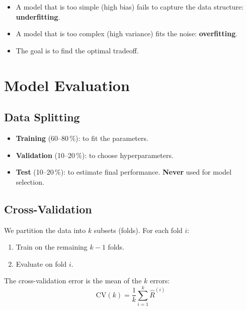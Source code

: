 \begin{intuition}[title=\textbf{Interpretation}]
\begin{itemize}
  \item A model that is too simple (high bias) fails to capture the data
    structure: \textbf{underfitting}.
  \item A model that is too complex (high variance) fits the noise:
    \textbf{overfitting}.
  \item The goal is to find the optimal tradeoff.
\end{itemize}
\end{intuition}

\section{Model Evaluation}
\label{sec:evaluation}

\subsection{Data Splitting}

\begin{bestpractice}[title=\textbf{Train / Validation / Test}]
\begin{itemize}
  \item \textbf{Training} (60--80\,\%): to fit the parameters.
  \item \textbf{Validation} (10--20\,\%): to choose hyperparameters.
  \item \textbf{Test} (10--20\,\%): to estimate final performance.
    \textbf{Never} used for model selection.
\end{itemize}
\end{bestpractice}

\subsection{Cross-Validation}

\begin{definition}
We partition the data into $k$ subsets (folds). For each fold $i$:
\begin{enumerate}
  \item Train on the remaining $k-1$ folds.
  \item Evaluate on fold $i$.
\end{enumerate}
The cross-validation error is the mean of the $k$ errors:
\begin{equation}
  \text{CV}(k) = \frac{1}{k} \sum_{i=1}^k \hat{R}^{(i)}
\end{equation}
\end{definition}

